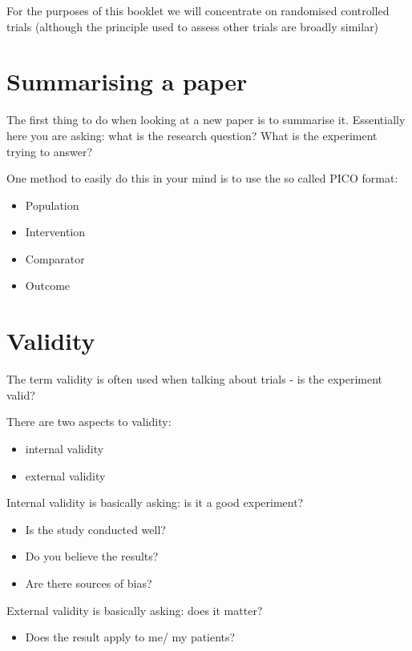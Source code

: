 \documentclass[
]{book}
\providecommand{\tightlist}{%
  \setlength{\itemsep}{0pt}\setlength{\parskip}{0pt}}
\theoremstyle{definition}
\theoremstyle{definition}
\theoremstyle{definition}
\theoremstyle{definition}
\theoremstyle{remark}
\begin{document}
For the purposes of this booklet we will concentrate on randomised controlled trials (although the principle used to assess other trials are broadly similar)

\hypertarget{summarising-a-paper}{%
\section{Summarising a paper}\label{summarising-a-paper}}

The first thing to do when looking at a new paper is to summarise it. Essentially here you are asking: what is the research question? What is the experiment trying to answer?

One method to easily do this in your mind is to use the so called PICO format:

\begin{itemize}
\tightlist
\item
  Population
\item
  Intervention
\item
  Comparator
\item
  Outcome
\end{itemize}

\hypertarget{validity}{%
\section{Validity}\label{validity}}

The term validity is often used when talking about trials - is the experiment valid?

There are two aspects to validity:

\begin{itemize}
\tightlist
\item
  internal validity
\item
  external validity
\end{itemize}

Internal validity is basically asking: is it a good experiment?

\begin{itemize}
\tightlist
\item
  Is the study conducted well?
\item
  Do you believe the results?
\item
  Are there sources of bias?
\end{itemize}

External validity is basically asking: does it matter?

\begin{itemize}
\tightlist
\item
  Does the result apply to me/ my patients?
\end{itemize}
\end{document}
